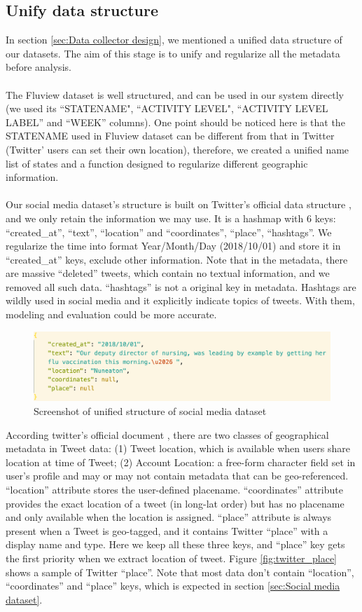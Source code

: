 \subsection{Unify data structure}
\label{sec:Unify data structure}
In section \ref{sec:Data collector design}, we mentioned a unified data structure of our datasets. The aim of this stage is to unify and regularize all the metadata before analysis. \\
\\The Fluview dataset is well structured, and can be used in our system directly (we used its ``STATENAME", ``ACTIVITY LEVEL", ``ACTIVITY LEVEL LABEL'' and ``WEEK'' columns). One point should be noticed here is that the STATENAME used in Fluview dataset can be different from that in Twitter (Twitter' users can set their own location), therefore, we created a unified name list of states and a function designed to regularize different geographic information.\\
\\
Our social media dataset's structure is built on Twitter's official data structure \cite{twitter_dev}, and we only retain the information we may use. It is a hashmap with 6 keys: ``created\_at'', ``text'', ``location'' and ``coordinates'', ``place'', ``hashtags''. We regularize the time into format Year/Month/Day (2018/10/01) and store it in ``created\_at'' keys, exclude other information. Note that in the metadata, there are massive ``deleted'' tweets, which contain no textual information, and we removed all such data. ``hashtags'' is not a original key in metadata. Hashtags are wildly used in social media and it explicitly indicate topics of tweets. With them, modeling and evaluation could be more accurate. 
\begin{figure}[!bp]
    \centering
    \includegraphics[width=5in]{images/dataset1.png}
    \caption{Screenshot of unified structure of social media dataset}
    \label{fig:social_data_sture}
\end{figure}
According twitter's official document \cite{twitter_dev}, there are two classes of geographical metadata in Tweet data: (1) Tweet location, which is available when users share location at time of Tweet; (2) Account Location: a free-form character field set in user's profile and may or may not contain metadata that can be geo-referenced. ``location'' attribute stores the user-defined placename. ``coordinates'' attribute provides the exact location of a tweet (in long-lat order) but has no placename and only available when the location is assigned. ``place'' attribute is always present when a Tweet is geo-tagged, and it contains Twitter ``place'' with a display name and type. Here we keep all these three keys, and ``place'' key gets the first priority when we extract location of tweet. Figure \ref{fig:twitter_place} shows a sample of Twitter ``place''. Note that most data don't contain ``location'', ``coordinates'' and ``place'' keys, which is expected in section \ref{sec:Social media dataset}.
